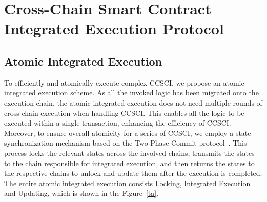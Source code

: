 \section{Cross-Chain Smart Contract Integrated Execution Protocol}


\subsection{Atomic Integrated Execution}
\label{subsec:execution}

To efficiently and atomically execute complex CCSCI, we propose an atomic integrated execution scheme. 
As all the invoked logic has been migrated onto the execution chain, the atomic integrated execution does not need multiple rounds of cross-chain execution when handling CCSCI.
This enables all the logic to be executed within a single transaction, enhancing the efficiency of CCSCI. 
Moreover, to ensure overall atomicity for a series of CCSCI, we employ a state synchronization mechanism based on the Two-Phase Commit protocol~\cite{lampson1993twopc}. 
This process locks the relevant states across the involved chains, transmits the states to the chain responsible for integrated execution, and then returns the states to the respective chains to unlock and update them after the execution is completed. 
The entire atomic integrated execution consists Locking, Integrated Execution and Updating, which is shown in the Figure~\ref{ta}.

